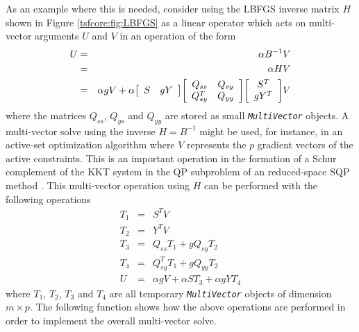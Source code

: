 As an example where this is needed, consider using the LBFGS inverse
matrix $H$ shown in Figure \ref{tsfcore:fig:LBFGS} as a linear
operator which acts on multi-vector arguments $U$ and $V$ in an
operation of the form
%
\begin{eqnarray*}
U & = & \alpha B^{-1} V \\
  & = & \alpha H V \\
  & = & \alpha g V + \alpha
                            {\bmat{cc} S & g Y \emat}
                            {\bmat{cc} Q_{ss} & Q_{sy} \\ Q_{sy}^T & Q_{yy} \emat}
                            {\bmat{c} S^T \\ g Y^T \emat} V
\end{eqnarray*}
%
where the matrices $Q_{ss}$, $Q_{ys}$ and $Q_{yy}$ are stored as small
\texttt{\textit{Multi\-Vector}} objects.  A multi-vector solve using
the inverse $H = B^{-1}$ might be used, for instance, in an active-set
optimization algorithm where $V$ represents the $p$ gradient vectors
of the active constraints.  This is an important operation in the
formation of a Schur complement of the KKT system in the QP subproblem
of an reduced-space SQP method \cite{RABartlett_2001}.  This
multi-vector operation using $H$ can be performed with the following
operations
%
\begin{eqnarray*}
T_1 & = & S^T V \\
T_2 & = & Y^T V \\
T_3 & = & Q_{ss} T_1 + g Q_{sy} T_2 \\
T_4 & = & Q_{sy}^T T_1 + g Q_{yy} T_2 \\
U   & = & \alpha g V + \alpha S T_3 + \alpha g Y T_4
\end{eqnarray*}
%
where $T_1$, $T_2$, $T_3$ and $T_4$ are all temporary
\texttt{\textit{Multi\-Vector}} objects of dimension $m \times p$.  The
following function shows how the above operations are performed in
order to implement the overall multi-vector solve.

